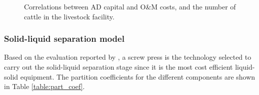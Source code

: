 \begin{refsection}[referencesCh4]
\begin{figure}[h]
	\caption{Correlations between AD capital and O\&M costs, and the number of cattle in the livestock facility.}
	\label{fig:AD_size_2cost}
\end{figure}

\subsubsection{Solid-liquid separation model}
Based on the evaluation reported by \citet{MollerSLsep}, a screw press is the technology selected to carry out the solid-liquid separation stage since it is the most cost efficient liquid-solid equipment. The partition coefficients for the different components are shown in Table \ref{table:part_coef}.
\begin{table}[h] 
		\centering
		\caption{Partition coefficients for solid-liquid manure separation using a screw press unit \protect\citep{MollerSLsep}} \label{table:part_coef}
\end{table}


\end{refsection}
